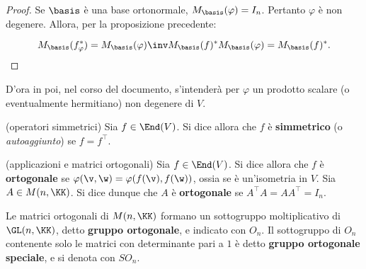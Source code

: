 \documentclass[11pt]{article}
\begin{document}
	\begin{proof}
		Se $\basis$ è una base ortonormale, $M_\basis(\varphi) = I_n$. Pertanto $\varphi$ è
		non degenere. Allora, per la proposizione precedente:
		
		\[ M_\basis(f_\varphi^*) = M_\basis(\varphi)\inv M_\basis(f)^* M_\basis(\varphi) = M_\basis(f)^*. \]
	\end{proof}

	\begin{note}
		D'ora in poi, nel corso del documento, s'intenderà per $\varphi$ un prodotto scalare (o eventualmente hermitiano) non degenere di $V$.
	\end{note}

	\begin{definition} (operatori simmetrici)
		Sia $f \in \End(V)$. Si dice allora che $f$ è \textbf{simmetrico} (o \textit{autoaggiunto}) se $f = f^\top$.
	\end{definition}

	\begin{definition} (applicazioni e matrici ortogonali)
		Sia $f \in \End(V)$. Si dice allora che $f$ è \textbf{ortogonale} se $\varphi(\v, \w) = \varphi(f(\v), f(\w))$,
		ossia se è un'isometria in $V$.
		Sia $A \in M(n, \KK)$. Si dice dunque che $A$ è \textbf{ortogonale} se $A^\top A = A A^\top = I_n$.
	\end{definition}

	\begin{definition}
		Le matrici ortogonali di $M(n, \KK)$ formano un sottogruppo moltiplicativo di $\GL(n, \KK)$, detto \textbf{gruppo ortogonale},
		e indicato con $O_n$. Il sottogruppo di $O_n$ contenente solo le matrici con determinante pari a $1$ è
		detto \textbf{gruppo ortogonale speciale}, e si denota con $SO_n$.
	\end{definition}
\end{document}
